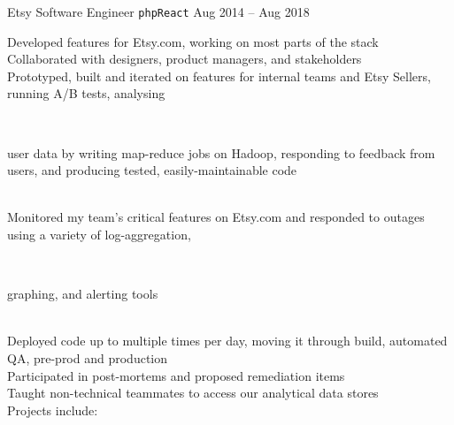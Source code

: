 \documentclass[9pt]{developercv} %
\begin{document}



\begin{entrylist}
    \entry
        {Etsy}
        {Software Engineer \hspace{1mm}\texttt{php}\slashsep\texttt{React}}
        {Aug 2014 -- Aug 2018}
        {
            Developed features for Etsy.com, working on most parts of the stack\\
            Collaborated with designers, product managers, and stakeholders\\
            Prototyped, built and iterated on features for internal teams and Etsy Sellers, running A/B tests, analysing\\
                \begin{minipage}[t]{0.05\textwidth}\,\end{minipage}
                \begin{minipage}[t]{0.85\textwidth}user data by writing map-reduce jobs on Hadoop, responding to feedback from users, and producing tested, easily-maintainable code\end{minipage}\\
            Monitored my team's critical features on Etsy.com and responded to outages using a variety of log-aggregation,\\
                \begin{minipage}[t]{0.05\textwidth}\,\end{minipage}
                \begin{minipage}[t]{0.85\textwidth}graphing, and alerting tools\end{minipage}\\
            Deployed code up to multiple times per day, moving it through build, automated QA, pre-prod and production\\
            Participated in post-mortems and proposed remediation items\\
            Taught non-technical teammates to access our analytical data stores\\
            Projects include:\\
}
\end{entrylist}
\end{document}
